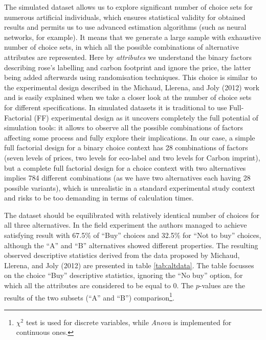 \documentclass[11pt,]{article}
\let\rmarkdownfootnote\footnote%
\def\footnote{\protect\rmarkdownfootnote}
\begin{document}
The simulated dataset allows us to explore significant number of choice
sets for numerous artificial individuals, which ensures statistical
validity for obtained results and permits us to use advanced estimation
algorithms (such as neural networks, for example). It means that we
generate a large sample with exhaustive number of choice sets, in which
all the possible combinations of alternative attributes are represented.
Here by \emph{attributes} we understand the binary factors describing
rose's labelling and carbon footprint and ignore the price, the latter
being added afterwards using randomisation techniques. This choice is
similar to the experimental design described in the Michaud, Llerena,
and Joly (2012) work and is easily explained when we take a closer look
at the number of choice sets for different specifications. In simulated
datasets it is traditional to use Full-Factorial (FF) experimental
design as it uncovers completely the full potential of simulation tools:
it allows to observe all the possible combinations of factors affecting
some process and fully explore their implications. In our case, a simple
full factorial design for a binary choice context has 28 combinations of
factors (seven levels of prices, two levels for eco-label and two levels
for Carbon imprint), but a complete full factorial design for a choice
context with two alternatives implies 784 different combinations (as we
have two alternatives each having 28 possible variants), which is
unrealistic in a standard experimental study context and risks to be too
demanding in terms of calculation times.

The dataset should be equilibrated with relatively identical number of
choices for all three alternatives. In the field experiment the authors
managed to achieve satisfying result with 67.5\% of ``Buy'' choices and
32.5\% for ``Not to buy'' choices, although the ``A'' and ``B''
alternatives showed different properties. The resulting observed
descriptive statistics derived from the data proposed by Michaud,
Llerena, and Joly (2012) are presented in table \ref{tab:altdata}. The
table focusses on the choice ``Buy'' descriptive statistics, ignoring
the ``No buy'' option, for which all the attributes are considered to be
equal to 0. The \(p\)-values are the results of the two subsets (``A''
and ``B'') comparison\footnote{\(\chi^2\) test is used for discrete
  variables, while \emph{Anova} is implemented for continuous ones.}.
\end{document}
